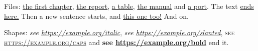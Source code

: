 \documentclass{article}
\begin{document}
Files: \href{notes/chapter-one}{the first chapter}, \href{report.pdf}{the report},
\href{data/table.csv}{a table}, \href{file:docs/manual}{the manual} and
\href{host.example.net:8080/x}{a port}. The text \href{https://example.org}{ends here.} Then a
new sentence starts, and \href{https://example.org/b}{this one too!} And on.

Shapes: \textit{see \url{https://example.org/italic}}, \textsl{see \url{https://example.org/slanted}},
\textsc{see \url{https://example.org/caps}} and \textbf{see \url{https://example.org/bold}} end it.
\end{document}

